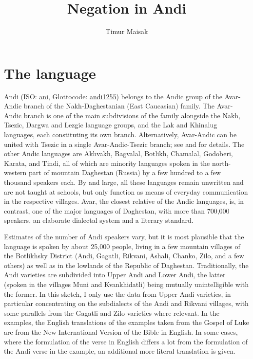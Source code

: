 \documentclass[output=paper,colorlinks=true, citecolor=brown]{langscibook}
\author{Timur Maisak\affiliation{}}
\title{Negation in Andi}
\begin{document}
\maketitle 


\section{The language} \label{sec:and:1}

Andi (ISO: \href{https://iso639-3.sil.org/code/ani}{ani}, Glottocode: \href{https://glottolog.org/resource/languoid/id/andi1255}{andi1255}) belongs to the Andic group of the Avar-Andic branch of the Nakh-Daghestanian (East Caucasian) family. The Avar-Andic branch is one of the main subdivisions of the family alongside the Nakh, Tsezic, Dargwa and Lezgic language groups, and the Lak and Khinalug languages, each constituting its own branch. Alternatively, Avar-Andic can be united with Tsezic in a single Avar-Andic-Tsezic branch; see \citet[30--31]{DobrushinaEtAl2020} and \citet[88]{GanenkovMaisak2020} for details. The other Andic languages are Akhvakh, Bagvalal, Botlikh, Chamalal, Godoberi, Karata, and Tindi, all of which are minority languages spoken in the north-western part of mountain Daghestan (Russia) by a few hundred to a few thousand speakers each. By and large, all these languages remain unwritten and are not taught at schools, but only function as means of everyday communication in the respective villages. Avar, the closest relative of the Andic languages, is, in contrast, one of the major languages of Daghestan, with more than 700,000 speakers, an elaborate dialectal system and a literary standard. 

Estimates of the number of Andi speakers vary, but it is most plausible that the language is spoken by about 25,000 people, living in a few mountain villages of the Botlikhsky District (Andi, Gagatli, Rikvani, Ashali, Chanko, Zilo, and a few others) as well as in the lowlands of the Republic of Daghestan. Traditionally, the Andi varieties are subdivided into Upper Andi and Lower Andi, the latter (spoken in the villages Muni and Kvankhidatli) being mutually unintelligible with the former. In this sketch, I only use the data from Upper Andi varieties, in particular concentrating on the subdialects of the Andi and Rikvani villages, with some parallels from the Gagatli and Zilo varieties where relevant. In the examples, the English translations of the examples taken from the Gospel of Luke are from the New International Version of the Bible in English. In some cases, where the formulation of the verse in English differs a lot from the formulation of the Andi verse in the example, an additional more literal translation is given.
\end{document}

